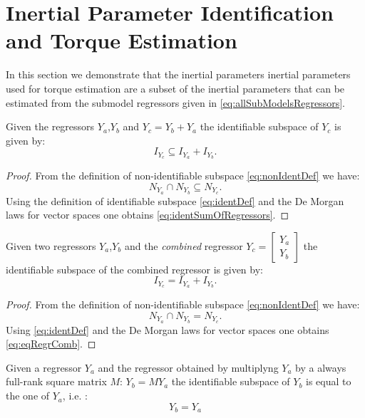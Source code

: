 \section{Inertial Parameter Identification and Torque Estimation}
\label{sec:iDynIdentification}

In this section we 
demonstrate that the inertial parameters inertial parameters used for torque estimation are a subset of the inertial parameters that can be estimated from the submodel regressors given in \eqref{eq:allSubModelsRegressors}.

\begin{property}
\label{prop:identSumOfRegressors}
Given the regressors ${Y_a}$,${Y_b}$ and ${Y_c} = {Y_b} + {Y_a}$ the 
identifiable subspace of $Y_c$ is given by:
\begin{equation}
\label{eq:identSumOfRegressors}
I_{{Y}_c} \subseteq I_{{Y}_a} + I_{{Y}_b} .
\end{equation}
\end{property} 
\begin{proof}
From the definition of non-identifiable subspace \eqref{eq:nonIdentDef} we have:
$$
N_{{Y}_a} \cap  N_{{Y}_b} \subseteq N_{{Y}_c} .
$$
Using the definition of identifiable subspace \eqref{eq:identDef} and the De Morgan laws for vector spaces one obtains \eqref{eq:identSumOfRegressors}.
\end{proof}

\begin{property}
\label{prop:eqRegrComb}
Given two regressors ${Y_a}$,${Y_b}$ and the \emph{combined} regressor ${Y_c} = \begin{bmatrix} {Y_a} \\ {Y_b} \end{bmatrix}$ the identifiable subspace of the combined regressor is given by:
\begin{equation}
\label{eq:eqRegrComb}
I_{{Y}_c} = I_{{Y}_a} + I_{{Y}_b} .
\end{equation}
\end{property}
\begin{proof}
From the definition of non-identifiable subspace \eqref{eq:nonIdentDef} we have:
$$
N_{{Y}_a} \cap  N_{{Y}_b} = N_{{Y}_c} .
$$
Using \eqref{eq:identDef} and the De Morgan laws for vector spaces one obtains \eqref{eq:eqRegrComb}.
\end{proof}

\begin{lemma}
Given a regressor $Y_a$ and the regressor obtained by multiplyng $Y_a$ by a always full-rank square matrix $M$: $Y_b = M Y_a$ the identifiable subspace of $Y_b$ is equal to the one of $Y_a$, i.e. :
\begin{equation}
Y_b = Y_a 
\end{equation}
\end{lemma}

